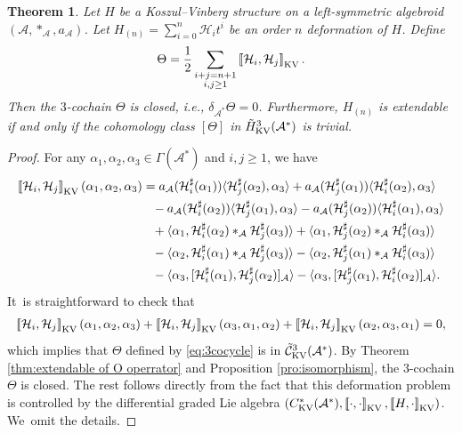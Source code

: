 \documentclass[pdftex]{sigma}%
\numberwithin{equation}{section}
\newtheorem{thm}{Theorem}[section]
\newcommand{\huaA}{\mathcal{A}}
\newcommand{\huaC}{\mathcal{C}}
\newcommand{\huaH}{\mathcal{H}}
\newcommand{\Courant}[1]{\left[\!\left[ #1\right]\!\right]}
\newcommand{\half}{\frac{1}{2}}
\begin{document}
\begin{thm}
Let $H$ be a Koszul--Vinberg structure on a left-symmetric algebroid $(\huaA,\ast_\huaA,a_\huaA)$. Let $H_{(n)}=\sum_{i=0}^{n}\huaH_it^i$ be an order $n$ deformation of $H$. Define\vspace{-.5ex}
 \begin{gather}\label{eq:3cocycle}
 \Theta=\half\sum_{\substack{i+j=n+1\\ i,j\geq1}}\Courant{\huaH_i,\huaH_j}_{\rm KV}.
 \end{gather}
 Then the $3$-cochain $\Theta$ is closed, i.e., $\delta_{\huaA^*}\Theta=0$. Furthermore, $H_{(n)}$ is {extendable} if and only if the cohomology class $[\Theta]$ in $\tilde{H}_{\rm KV}^3(\huaA^*)$ is trivial.
\end{thm}
\begin{proof}
	For any $ \alpha_1,\alpha_2,\alpha_3\in\Gamma(\huaA^*)$ and $i,j\geq 1$, we have
\begin{align*}%
\Courant{\huaH_i,\huaH_j}_{\rm KV}(\alpha_1,\alpha_2,\alpha_3)
&=a_\huaA(\huaH^\sharp_i(\alpha_1))\langle \huaH^\sharp_j(\alpha_2),\alpha_3\rangle+a_\huaA(\huaH^\sharp_j(\alpha_1))\langle \huaH^\sharp_i(\alpha_2),\alpha_3\rangle
\\
&\phantom{=}-a_\huaA(\huaH^\sharp_i(\alpha_2))\langle \huaH^\sharp_j(\alpha_1),\alpha_3\rangle
-a_\huaA(\huaH^\sharp_j(\alpha_2))\langle \huaH^\sharp_i(\alpha_1),\alpha_3\rangle
\\
&\phantom{=}+\langle \alpha_1,\huaH^\sharp_i(\alpha_2)\ast_\huaA \huaH^\sharp_j(\alpha_3)\rangle +\langle \alpha_1,\huaH^\sharp_j(\alpha_2)\ast_\huaA \huaH^\sharp_i(\alpha_3)\rangle \\
&\phantom{=}-\langle\alpha_2,\huaH^\sharp_i(\alpha_1)\ast_\huaA \huaH^\sharp_j(\alpha_3)\rangle-\langle\alpha_2,\huaH^\sharp_j(\alpha_1)\ast_\huaA \huaH^\sharp_i(\alpha_3)\rangle
\\
&\phantom{=}-\langle \alpha_3,[\huaH^\sharp_i(\alpha_1),
\huaH^\sharp_j(\alpha_2)]_\huaA\rangle
-\langle \alpha_3,[\huaH^\sharp_j(\alpha_1),
\huaH^\sharp_i(\alpha_2)]_\huaA\rangle.
\end{align*}
It~is straightforward to	check that\vspace{-.5ex}
\begin{gather*}
\Courant{\huaH_i,\huaH_j}_{\rm KV}(\alpha_1,\alpha_2,\alpha_3)+ \Courant{\huaH_i,\huaH_j}_{\rm KV}(\alpha_3,\alpha_1,\alpha_2)+\Courant{\huaH_i,\huaH_j}_{\rm KV}(\alpha_2,\alpha_3,\alpha_1)=0,
\end{gather*}
which implies that $\Theta$ defined by \eqref{eq:3cocycle} is in $\tilde{\huaC}_{\rm KV}^3(\huaA^*)$. By Theorem \ref{thm:extendable of O operrator} and Proposition \ref{pro:isomorphism}, the $3$-cochain $\Theta$ is closed. The rest follows directly from the fact that this deformation problem is controlled by the differential graded Lie algebra $(C_{\rm KV}^{*}(\huaA^*),\Courant{\cdot,\cdot}_{\rm KV},\Courant{H,\cdot}_{\rm KV})$. We~omit the details.\vspace{-1ex}
	\end{proof}	
\end{document}
